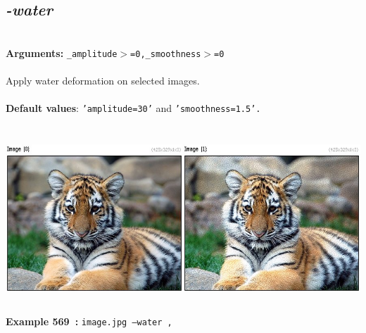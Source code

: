 \documentclass[a4paper,11pt,twoside]{book}
\begin{document}
\subsection{\emph{-water} }\vspace*{-0.5em}
~\\\textbf{Arguments: } 
{\small \texttt{\_amplitude$>$=0,\_smoothness$>$=0}}\\~\\
Apply water deformation on selected images.
~\\~\\\textbf{Default values}: {\small \texttt{'amplitude=30'} and \texttt{'smoothness=1.5'.}}
\begin{center}\includegraphics[keepaspectratio=true,height=7cm,width=\textwidth]{img/gmic_def569.jpg}\\
{\footnotesize \textbf{Example 569~:} \texttt{image.jpg --water ,}}
\end{center}
\end{document}
